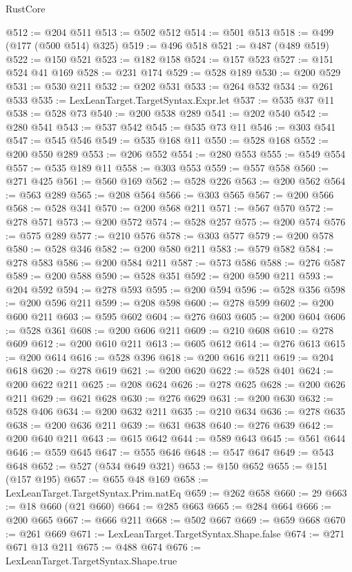 \begin{lexlean}{RustCore}
\begin{coremodule}
@512 := @204 @511
@513 := @502 @512
@514 := @501 @513
@518 := @499 (@177 (@500 @514) @325)
@519 := @496 @518
@521 := @487 (@489 @519)
@522 := @150 @521
@523 := @182 @158
@524 := @157 @523
@527 := @151 @524 @41 @169
@528 := @231 @174
@529 := @528 @189
@530 := @200 @529
@531 := @530 @211
@532 := @202 @531
@533 := @264 @532
@534 := @261 @533
@535 := LexLeanTarget.TargetSyntax.Expr.let
@537 := @535 @37 @11
@538 := @528 @73
@540 := @200 @538 @289
@541 := @202 @540
@542 := @280 @541
@543 := @537 @542
@545 := @535 @73 @11
@546 := @303 @541
@547 := @545 @546
@549 := @535 @168 @11
@550 := @528 @168
@552 := @200 @550 @289
@553 := @206 @552
@554 := @280 @553
@555 := @549 @554
@557 := @535 @189 @11
@558 := @303 @553
@559 := @557 @558
@560 := @271 @425
@561 := @560 @169
@562 := @528 @226
@563 := @200 @562
@564 := @563 @289
@565 := @208 @564
@566 := @303 @565
@567 := @200 @566
@568 := @528 @341
@570 := @200 @568 @211
@571 := @567 @570
@572 := @278 @571
@573 := @200 @572
@574 := @528 @257
@575 := @200 @574
@576 := @575 @289
@577 := @210 @576
@578 := @303 @577
@579 := @200 @578
@580 := @528 @346
@582 := @200 @580 @211
@583 := @579 @582
@584 := @278 @583
@586 := @200 @584 @211
@587 := @573 @586
@588 := @276 @587
@589 := @200 @588
@590 := @528 @351
@592 := @200 @590 @211
@593 := @204 @592
@594 := @278 @593
@595 := @200 @594
@596 := @528 @356
@598 := @200 @596 @211
@599 := @208 @598
@600 := @278 @599
@602 := @200 @600 @211
@603 := @595 @602
@604 := @276 @603
@605 := @200 @604
@606 := @528 @361
@608 := @200 @606 @211
@609 := @210 @608
@610 := @278 @609
@612 := @200 @610 @211
@613 := @605 @612
@614 := @276 @613
@615 := @200 @614
@616 := @528 @396
@618 := @200 @616 @211
@619 := @204 @618
@620 := @278 @619
@621 := @200 @620
@622 := @528 @401
@624 := @200 @622 @211
@625 := @208 @624
@626 := @278 @625
@628 := @200 @626 @211
@629 := @621 @628
@630 := @276 @629
@631 := @200 @630
@632 := @528 @406
@634 := @200 @632 @211
@635 := @210 @634
@636 := @278 @635
@638 := @200 @636 @211
@639 := @631 @638
@640 := @276 @639
@642 := @200 @640 @211
@643 := @615 @642
@644 := @589 @643
@645 := @561 @644
@646 := @559 @645
@647 := @555 @646
@648 := @547 @647
@649 := @543 @648
@652 := @527 (@534 @649 @321)
@653 := @150 @652
@655 := @151 (@157 @195)
@657 := @655 @48 @169
@658 := LexLeanTarget.TargetSyntax.Prim.natEq
@659 := @262 @658
@660 := 29
@663 := @18 @660 (@21 @660)
@664 := @285 @663
@665 := @284 @664
@666 := @200 @665
@667 := @666 @211
@668 := @502 @667
@669 := @659 @668
@670 := @261 @669
@671 := LexLeanTarget.TargetSyntax.Shape.false
@674 := @271 @671 @13 @211
@675 := @488 @674
@676 := LexLeanTarget.TargetSyntax.Shape.true

\end{coremodule}
\end{lexlean}
